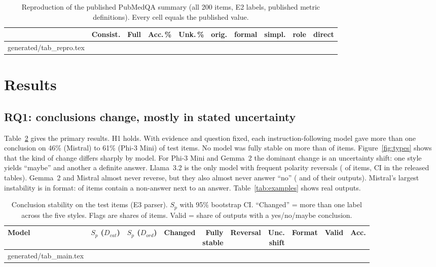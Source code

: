 \documentclass[acmsmall]{acmart}
\begin{document}
\begin{table}[t]
\caption{Reproduction of the published PubMedQA summary (all 200 items, E2 labels, published metric definitions). Every cell equals the published value.}\label{tab:repro}
\footnotesize\setlength{\tabcolsep}{4pt}
\begin{tabular}{@{}lrrrrrrrrr@{}}
\toprule
& Consist. & Full & Acc.\,\% & Unk.\,\% & orig. & formal & simpl. & role & direct \\
\midrule
{} generated/tab_repro.tex
\bottomrule
\end{tabular}
\end{table}

\section{Results}\label{sec:results}
\subsection{RQ1: conclusions change, mostly in stated uncertainty}\label{sec:rq1}
Table~\ref{tab:main} gives the primary results. H1 holds. With evidence and question fixed, each instruction-following model gave more than one conclusion on 46\% (Mistral) to 61\% (Phi-3 Mini) of test items. No model was fully stable on more than \FullMistral{} of items. Figure~\ref{fig:types} shows that the kind of change differs sharply by model. For Phi-3 Mini and Gemma~2 the dominant change is an uncertainty shift: one style yields ``maybe'' and another a definite answer. Llama~3.2 is the only model with frequent polarity reversals (\RevLlama{} of items, CI in the released tables). Gemma~2 and Mistral almost never reverse, but they also almost never answer ``no'' (\NoGemma{} and \NoMistral{} of their outputs). Mistral's largest instability is in format: \FmtMistral{} of items contain a non-answer next to an answer. Table~\ref{tab:examples} shows real outputs.

\begin{table}[t]
\caption{Conclusion stability on the \NTest{} test items (E3 parser). $S_p$ with 95\% bootstrap CI. ``Changed'' = more than one label across the five styles. Flags are shares of items. Valid = share of outputs with a yes/no/maybe conclusion.}\label{tab:main}
\footnotesize\setlength{\tabcolsep}{3.2pt}
\begin{tabular}{@{}lrrrrrrrrr@{}}
\toprule
Model & $S_p$ ($D_{cat}$) & \shortstack[r]{$S_p$\\($D_{ord}$)} & Changed & \shortstack[r]{Fully\\stable} & Reversal & \shortstack[r]{Unc.\\shift} & Format & Valid & Acc. \\
\midrule
{} generated/tab_main.tex
\bottomrule
\end{tabular}
\end{table}
\end{document}
